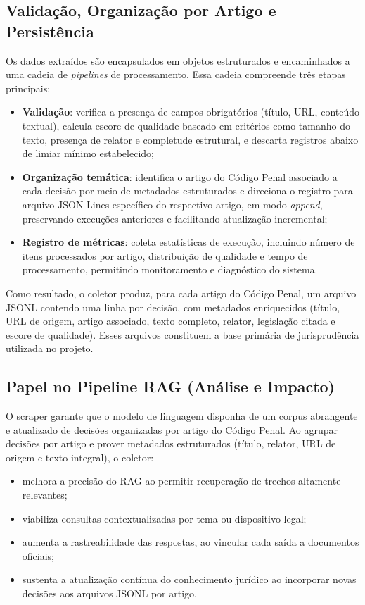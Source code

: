 \subsection{Validação, Organização por Artigo e Persistência}
Os dados extraídos são encapsulados em objetos estruturados e encaminhados a uma cadeia de \textit{pipelines} de processamento. Essa cadeia compreende três etapas principais:

\begin{itemize}
  \item \textbf{Validação}: verifica a presença de campos obrigatórios (título, URL, conteúdo textual), calcula escore de qualidade baseado em critérios como tamanho do texto, presença de relator e completude estrutural, e descarta registros abaixo de limiar mínimo estabelecido;
  \item \textbf{Organização temática}: identifica o artigo do Código Penal associado a cada decisão por meio de metadados estruturados e direciona o registro para arquivo JSON Lines específico do respectivo artigo, em modo \textit{append}, preservando execuções anteriores e facilitando atualização incremental;
  \item \textbf{Registro de métricas}: coleta estatísticas de execução, incluindo número de itens processados por artigo, distribuição de qualidade e tempo de processamento, permitindo monitoramento e diagnóstico do sistema.
\end{itemize}

Como resultado, o coletor produz, para cada artigo do Código Penal, um arquivo JSONL contendo uma linha por decisão, com metadados enriquecidos (título, URL de origem, artigo associado, texto completo, relator, legislação citada e escore de qualidade). Esses arquivos constituem a base primária de jurisprudência utilizada no projeto.

\subsection{Papel no Pipeline RAG (Análise e Impacto)}
O scraper garante que o modelo de linguagem disponha de um corpus abrangente e atualizado de decisões organizadas por artigo do Código Penal. Ao agrupar decisões por artigo e prover metadados estruturados (título, relator, URL de origem e texto integral), o coletor:

\begin{itemize}
  \item melhora a precisão do RAG ao permitir recuperação de trechos altamente relevantes;
  \item viabiliza consultas contextualizadas por tema ou dispositivo legal;
  \item aumenta a rastreabilidade das respostas, ao vincular cada saída a documentos oficiais;
  \item sustenta a atualização contínua do conhecimento jurídico ao incorporar novas decisões aos arquivos JSONL por artigo.
\end{itemize}

